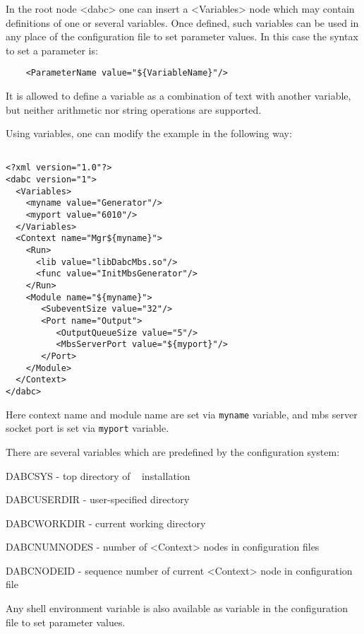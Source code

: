 In the root node <dabc> one can insert a <Variables> node which may contain 
definitions of one or several variables. Once defined, 
such variables can be used in any place of the configuration file to set parameter values.
In this case the syntax to set a parameter is:

\begin{small}
\begin{verbatim}
    <ParameterName value="${VariableName}"/>
\end{verbatim}
\end{small}

It is allowed to define a variable as a combination of text with another variable, 
but neither arithmetic nor string operations are supported. 

Using variables, one can modify the example in the following way:

\begin{small}
\begin{verbatim}

<?xml version="1.0"?>
<dabc version="1">
  <Variables>
    <myname value="Generator"/> 
    <myport value="6010"/> 
  </Variables>
  <Context name="Mgr${myname}">
    <Run>
      <lib value="libDabcMbs.so"/>
      <func value="InitMbsGenerator"/>
    </Run>
    <Module name="${myname}">
       <SubeventSize value="32"/>
       <Port name="Output">
          <OutputQueueSize value="5"/>
          <MbsServerPort value="${myport}"/>
       </Port>
    </Module>
  </Context>
</dabc>
\end{verbatim}
\end{small}

Here context name and module name are set via {\tt myname} variable,
and mbs server socket port is set via {\tt myport} variable.

There are several variables which are predefined by the configuration system:

\bbul
\item DABCSYS - top directory of \dabc~ installation
\item DABCUSERDIR - user-specified directory
\item DABCWORKDIR - current working directory
\item DABCNUMNODES - number of <Context> nodes in configuration files
\item DABCNODEID - sequence number of current <Context> node in configuration file 
\ebul

Any shell environment variable 
is also available as variable in the configuration file to set parameter values. 

